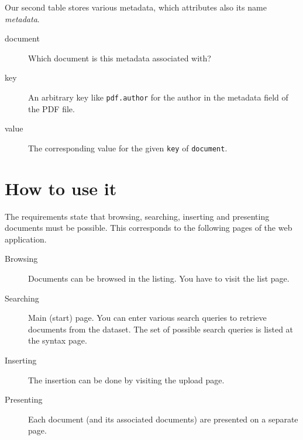 \documentclass{article}
\begin{document}
Our second table stores various metadata, which attributes also its name \emph{metadata}.
\begin{description}
  \item[document] Which document is this metadata associated with?
  \item[key] An arbitrary key like \texttt{pdf.author} for the author in the metadata field of the PDF file.
  \item[value] The corresponding value for the given \texttt{key} of \texttt{document}.
\end{description}

\section{How to use it}
%
The requirements state that browsing, searching, inserting and presenting documents must be possible.
This corresponds to the following pages of the web application.
\begin{description}
  \item[Browsing]
    Documents can be browsed in the listing. You have to visit the list page.
  \item[Searching]
    Main (start) page. You can enter various search queries to retrieve documents from the dataset.
    The set of possible search queries is listed at the syntax page.
  \item[Inserting]
    The insertion can be done by visiting the upload page.
  \item[Presenting]
    Each document (and its associated documents) are presented on a separate page.
\end{description}
\end{document}
